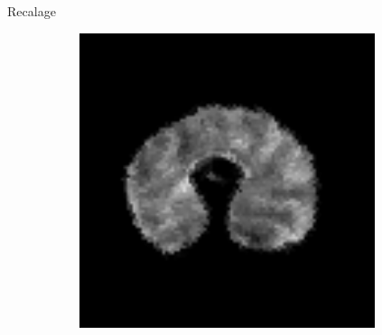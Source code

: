 \documentclass[10pt]{beamer}
\begin{document}
\begin{frame}{Recalage}
\begin{figure}[ht]
\begin{subfigure}[t]{0.25\textwidth}
    \caption{}
    \label{subfig:registration_wheat_ssd}
  \end{subfigure}%
  \begin{subfigure}[t]{0.25\textwidth}
    \centering
    \includegraphics[width=0.95\textwidth]{fig/registration_wheat_dtssd}
    \caption{}
    \label{subfig:registration_wheat_dtssd}
  \end{subfigure}%
\end{figure}
\end{frame}
\end{document}
